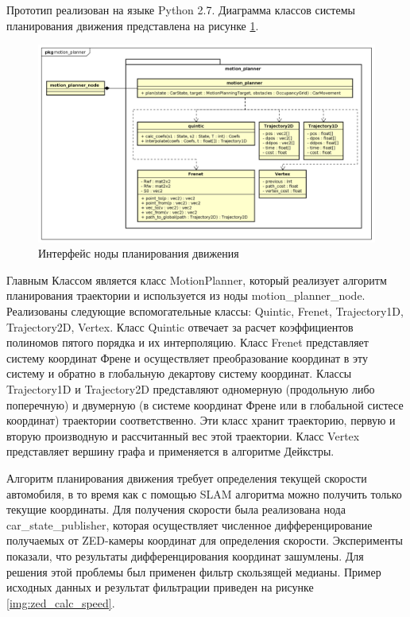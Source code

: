 Прототип реализован на языке Python 2.7. Диаграмма классов системы планирования движения представлена на рисунке
\ref{img:motion_planner_classes}.

\begin{figure}[h]
    \centering
    \includegraphics[width=\linewidth]{images/3_devel/motion_planner_classes}
    \caption{Интерфейс ноды планирования движения}
    \label{img:motion_planner_classes}
\end{figure}

Главным Классом является класс MotionPlanner, который реализует алгоритм планирования траектории и используется
из ноды motion\_planner\_node. Реализованы следующие вспомогательные классы: Quintic, Frenet, Trajectory1D,
Trajectory2D, Vertex. Класс Quintic отвечает за расчет коэффициентов полиномов пятого порядка и их интерполяцию.
Класс Frenet представляет систему координат Френе и осуществляет преобразование координат в эту систему и
обратно в глобальную декартову систему координат. Классы Trajectory1D и Trajectory2D представляют одномерную
(продольную либо поперечную) и двумерную (в системе координат Френе или в глобальной систесе координат) траектории
соответственно. Эти класс хранит траекторию, первую и вторую производную и рассчитанный вес этой траектории.
Класс Vertex представляет вершину графа и применяется в алгоритме Дейкстры.

Алгоритм планирования движения требует определения текущей скорости автомобиля, в то время как с помощью
SLAM алгоритма можно получить только текущие координаты. Для получения скорости была реализована нода car\_state\_publisher,
которая осуществляет численное дифференцирование получаемых от ZED-камеры координат для определения скорости.
Эксперименты показали, что результаты дифференцирования координат зашумлены. Для решения этой проблемы был применен
фильтр скользящей медианы. Пример исходных данных и результат фильтрации приведен на рисунке \ref{img:zed_calc_speed}.

